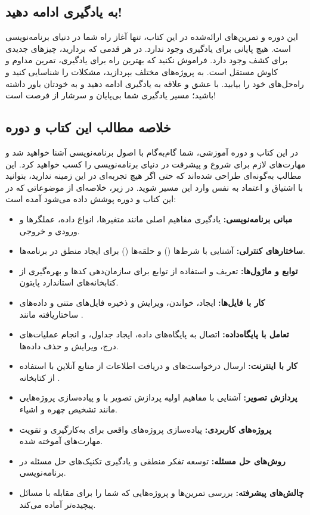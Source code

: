 \documentclass[a4paper,12pt]{article}
\begin{document}
	\subsection*{به یادگیری ادامه دهید!}
	این دوره و تمرین‌های ارائه‌شده در این کتاب، تنها آغاز راه شما در دنیای برنامه‌نویسی است. هیچ پایانی برای یادگیری وجود ندارد. در هر قدمی که بردارید، چیزهای جدیدی برای کشف وجود دارد. فراموش نکنید که بهترین راه برای یادگیری، تمرین مداوم و کاوش مستقل است. به پروژه‌های مختلف بپردازید، مشکلات را شناسایی کنید و راه‌حل‌های خود را بیابید. با عشق و علاقه به یادگیری ادامه دهید و به خودتان باور داشته باشید؛ مسیر یادگیری شما بی‌پایان و سرشار از فرصت است!
	
	\subsection*{خلاصه مطالب این کتاب و دوره}
	
	در این کتاب و دوره آموزشی، شما گام‌به‌گام با اصول برنامه‌نویسی آشنا خواهید شد و مهارت‌های لازم برای شروع و پیشرفت در دنیای برنامه‌نویسی را کسب خواهید کرد. این مطالب به‌گونه‌ای طراحی شده‌اند که حتی اگر هیچ تجربه‌ای در این زمینه ندارید، بتوانید با اشتیاق و اعتماد به نفس وارد این مسیر شوید. در زیر، خلاصه‌ای از موضوعاتی که در این کتاب و دوره پوشش داده می‌شود آمده است:
	
	\begin{itemize}
		\item \textbf{مبانی برنامه‌نویسی:} یادگیری مفاهیم اصلی مانند متغیرها، انواع داده، عملگرها و ورودی و خروجی.
		\item \textbf{ساختارهای کنترلی:} آشنایی با شرط‌ها () و حلقه‌ها () برای ایجاد منطق در برنامه‌ها.
		\item \textbf{توابع و ماژول‌ها:} تعریف و استفاده از توابع برای سازمان‌دهی کدها و بهره‌گیری از کتابخانه‌های استاندارد پایتون.
		\item \textbf{کار با فایل‌ها:} ایجاد، خواندن، ویرایش و ذخیره فایل‌های متنی و داده‌های ساختاریافته مانند .
		\item \textbf{تعامل با پایگاه‌داده:} اتصال به پایگاه‌های داده، ایجاد جداول، و انجام عملیات‌های درج، ویرایش و حذف داده‌ها.
		\item \textbf{کار با اینترنت:} ارسال درخواست‌های  و دریافت اطلاعات از منابع آنلاین با استفاده از کتابخانه .
		\item \textbf{پردازش تصویر:} آشنایی با مفاهیم اولیه پردازش تصویر با  و پیاده‌سازی پروژه‌هایی مانند تشخیص چهره و اشیاء.
		\item \textbf{پروژه‌های کاربردی:} پیاده‌سازی پروژه‌های واقعی برای به‌کارگیری و تقویت مهارت‌های آموخته شده.
		\item \textbf{روش‌های حل مسئله:} توسعه تفکر منطقی و یادگیری تکنیک‌های حل مسئله در برنامه‌نویسی.
		\item \textbf{چالش‌های پیشرفته:} بررسی تمرین‌ها و پروژه‌هایی که شما را برای مقابله با مسائل پیچیده‌تر آماده می‌کند.
	\end{itemize}
	
\end{document}
